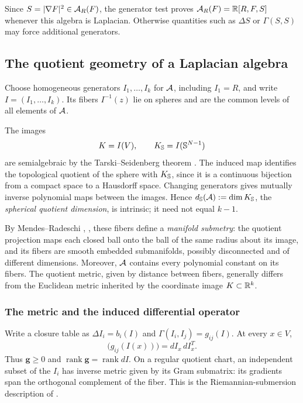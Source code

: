 Since \(S=|\nabla F|^2\in\mathcal A_R(F)\), the generator test proves
\(\mathcal A_R(F)=\mathbb R[R,F,S]\) whenever this algebra is Laplacian.
Otherwise quantities such as \(\Delta S\) or \(\Gamma(S,S)\) may
force additional generators.

\subsection{The quotient geometry of a Laplacian algebra}
\label{sec:laplacian-quotient-background}

Choose homogeneous generators \(I_1,\ldots,I_k\) for \(\mathcal A\),
including \(I_1=R\), and write \(I=(I_1,\ldots,I_k)\).
Its fibers \(I^{-1}(z)\) lie on spheres and are the common levels
of all elements of \(\mathcal A\).

The images
\[
 K=I(V),\qquad K_{\mathbb S}=I(\mathbb S^{N-1})
\]
are semialgebraic by the Tarski--Seidenberg theorem
\cite[Section~2.2]{BochnakCosteRoy98}.
The induced map identifies the topological quotient of the sphere
with \(K_{\mathbb S}\), since it is a continuous bijection from a compact
space to a Hausdorff space. Changing generators gives mutually inverse
polynomial maps between the images. Hence \(d_{\mathbb S}(\mathcal A):=\dim K_{\mathbb S}\),
the \emph{spherical quotient dimension}, is intrinsic; it need not
equal \(k-1\).

By Mendes--Radeschi
\cite[Theorem~A and Theorem~25]{MendesRadeschi},
\cite[Theorem~A and Corollary~B]{MendesRadeschiMaximality}, these
fibers define a \emph{manifold submetry}: the quotient projection maps
each closed ball onto the ball of the same radius about its image, and
its fibers are smooth embedded submanifolds, possibly disconnected and
of different dimensions. Moreover, \(\mathcal A\) contains every polynomial
constant on its fibers. The quotient metric, given by distance between
fibers, generally differs from the Euclidean metric inherited by the
coordinate image \(K\subset\mathbb R^k\).

\subsubsection{The metric and the induced differential operator}

Write a closure table as
\(\Delta I_i=b_i(I)\) and
\(\Gamma(I_i,I_j)=g_{ij}(I)\). At every \(x\in V\),
\begin{equation}\label{eq:background-quotient-Gram}
 \bigl(g_{ij}(I(x))\bigr)=dI_x\,dI_x^T.
\end{equation}
Thus \(\mathbf g\ge0\) and \(\operatorname{rank}\mathbf g
=\operatorname{rank}dI\). On a regular quotient chart, an independent
subset of the \(I_i\) has inverse metric given by its Gram submatrix:
its gradients span the orthogonal complement of the fiber. This is
the Riemannian-submersion description of
\cite[Proposition~26]{MendesRadeschi}.

